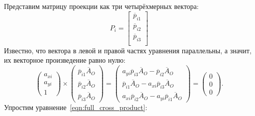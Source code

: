 \documentclass[14pt, a4paper]{extarticle}
\begin{document}
 Представим матрицу проекции как три четырёхмерных вектора:
\begin{equation}
    P_i = \begin{bmatrix}
        \overline{p}_{i1}\\
        \overline{p}_{i2}\\
        \overline{p}_{i3}\\
    \end{bmatrix}
\end{equation}
Известно, что вектора в левой и правой частях уравнения параллельны, а значит,
их векторное произведение равно нулю:
\begin{equation}
    \begin{pmatrix}
        a_{xi}\\
        a_{yi}\\
        1
    \end{pmatrix} \times \begin{pmatrix}
        \overline{p}_{i1} \overline{A}_O\\
        \overline{p}_{i2} \overline{A}_O\\
        \overline{p}_{i3} \overline{A}_O
    \end{pmatrix} = \begin{pmatrix}
        a_{yi} \overline{p}_{i3} \overline{A}_O - \overline{p}_{i2} \overline{A}_O\\
        \overline{p}_{i1} \overline{A}_O - a_{xi} \overline{p}_{i3} \overline{A}_O\\
        a_{xi} \overline{p}_{i2} \overline{A}_O - a_{yi} \overline{p}_{i1} \overline{A}_O
    \end{pmatrix} = \begin{pmatrix}
        0\\
        0\\
        0
    \end{pmatrix}.
\label{eqn:full_cross_product}
\end{equation}
Упростим уравнение~\ref{eqn:full_cross_product}:
\end{document}
